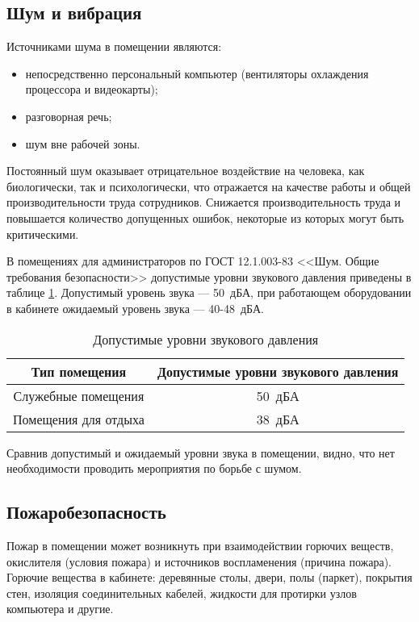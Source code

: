 \subsection{Шум и вибрация}

Источниками шума в помещении являются:
\begin{itemize}
  \item непосредственно персональный компьютер (вентиляторы охлаждения процессора и видеокарты);
  \item разговорная речь;
  \item шум вне рабочей зоны.
\end{itemize}

Постоянный шум оказывает отрицательное воздействие на человека, как биологически, так и психологически, что отражается на качестве работы и общей производительности труда сотрудников.
Снижается производительность труда и повышается количество допущенных ошибок, некоторые из которых могут быть критическими.

В помещениях для администраторов по ГОСТ 12.1.003-83 <<Шум. Общие требования безопасности>> допустимые уровни звукового давления приведены в таблице \ref{sound-tab}.
Допустимый уровень звука --- 50~дБА, при работающем оборудовании в кабинете ожидаемый уровень звука --- 40-48~дБА.
\begin{table}[H]
  \caption{Допустимые уровни звукового давления}\label{sound-tab}
  \begin{tabular}{|c|c|}
  \hline Тип помещения & Допустимые уровни звукового давления \\
  \hline Служебные помещения & 50~дБА \\
  \hline Помещения для отдыха & 38~дБА \\
  \hline 
  \end{tabular}
\end{table}

Сравнив допустимый и ожидаемый уровни звука в помещении, видно, что нет необходимости проводить мероприятия по борьбе с шумом.

\subsection{Пожаробезопасность}

Пожар в помещении может возникнуть при взаимодействии горючих веществ, окислителя (условия пожара) и источников воспламенения (причина пожара).
Горючие вещества в кабинете: деревянные столы, двери, полы (паркет), покрытия стен, изоляция соединительных кабелей, жидкости для протирки узлов компьютера и другие.

